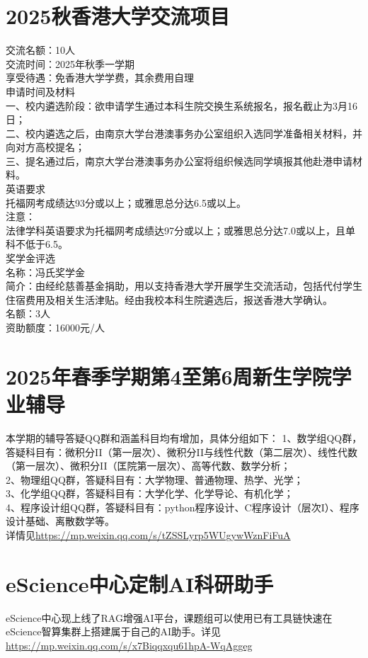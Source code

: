 \documentclass[letterpaper, 12pt]{article}
\begin{document}
\begin{multicols}{2}
\section{2025秋香港大学交流项目}
交流名额：10人\\
交流时间：2025年秋季一学期\\
享受待遇：免香港大学学费，其余费用自理\\
申请时间及材料\\
一、校内遴选阶段：欲申请学生通过本科生院交换生系统报名，报名截止为3月16日；\\
二、校内遴选之后，由南京大学台港澳事务办公室组织入选同学准备相关材料，并向对方高校提名；\\
三、提名通过后，南京大学台港澳事务办公室将组织候选同学填报其他赴港申请材料。\\
英语要求\\
托福网考成绩达93分或以上；或雅思总分达6.5或以上。\\
注意：\\
法律学科英语要求为托福网考成绩达97分或以上；或雅思总分达7.0或以上，且单科不低于6.5。\\
奖学金评选\\
名称：冯氏奖学金\\
简介：由经纶慈善基金捐助，用以支持香港大学开展学生交流活动，包括代付学生住宿费用及相关生活津贴。经由我校本科生院遴选后，报送香港大学确认。\\
名额：3人\\
资助额度：16000元/人\\



\section{2025年春季学期第4至第6周新生学院学业辅导}
本学期的辅导答疑QQ群和涵盖科目均有增加，具体分组如下：
1、数学组QQ群，答疑科目有：微积分II（第一层次）、微积分II与线性代数（第二层次）、线性代数（第一层次）、微积分II（匡院第一层次）、高等代数、数学分析；\\
2、物理组QQ群，答疑科目有：大学物理、普通物理、热学、光学；\\
3、化学组QQ群，答疑科目有：大学化学、化学导论、有机化学；\\
4、程序设计组QQ群，答疑科目有：python程序设计、C程序设计（层次I）、程序设计基础、离散数学等。\\
详情见\url{https://mp.weixin.qq.com/s/tZSSLyrp5WUgywWznFiFuA}\\
\section{eScience中心定制AI科研助手}
eScience中心现上线了RAG增强AI平台，课题组可以使用已有工具链快速在eScience智算集群上搭建属于自己的AI助手。详见\url{https://mp.weixin.qq.com/s/x7Biqqxqu61hpA-WqAggeg}

\end{multicols}
\end{document}
